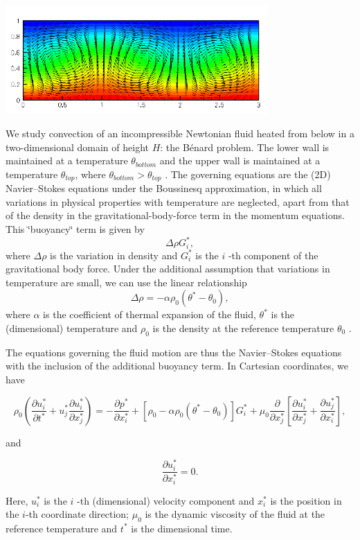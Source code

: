  
\begin{DoxyImage}
\includegraphics[width=0.75\textwidth]{symm_broken}
\end{DoxyImage}


We study convection of an incompressible Newtonian fluid heated from below in a two-\/dimensional domain of height $ H $\+: the B\'{e}nard problem. The lower wall is maintained at a temperature $ \theta_{bottom} $ and the upper wall is maintained at a temperature $ \theta_{top} $, where $ \theta_{bottom} > \theta_{top} $ . The governing equations are the (2D) Navier--Stokes equations under the Boussinesq approximation, in which all variations in physical properties with temperature are neglected, apart from that of the density in the gravitational-\/body-\/force term in the momentum equations. This \char`\"{}buoyancy\char`\"{} term is given by \[ \Delta\rho G^{*}_{i}, \] where $ \Delta\rho $ is the variation in density and $ G^{*}_{i} $ is the $ i $ -\/th component of the gravitational body force. Under the additional assumption that variations in temperature are small, we can use the linear relationship \[ \Delta\rho = -\alpha\rho_{0}(\theta^{*} - \theta_{0}), \] where $ \alpha $ is the coefficient of thermal expansion of the fluid, $ \theta^{*} $ is the (dimensional) temperature and $ \rho_{0} $ is the density at the reference temperature $ \theta_{0} $ .

The equations governing the fluid motion are thus the Navier--Stokes equations with the inclusion of the additional buoyancy term. In Cartesian coordinates, we have \begin{center} \[ \rho_{0} \left (\frac{\partial u^{*}_i}{\partial t^{*}} + u^{*}_j \frac{\partial u^{*}_i}{\partial x^{*}_j} \right) = - \frac{\partial p^{*}}{\partial x^{*}_i} + \left[\rho_{0} - \alpha\rho_{0}(\theta^{*} - \theta_{0})\right] G^{*}_i + \mu_{0} \frac{\partial }{\partial x^{*}_j} \left[ \frac{\partial u^{*}_i}{\partial x^{*}_j} + \frac{\partial u^{*}_j}{\partial x^{*}_i} \right], \] \end{center}  and \begin{center} \[ \frac{\partial u^{*}_i}{\partial x^{*}_i} = 0. \] \end{center}  Here, $ u^{*}_{i} $ is the $ i $ -\/th (dimensional) velocity component and $ x^{*}_{i} $ is the position in the $i$-\/th coordinate direction; $ \mu_{0} $ is the dynamic viscosity of the fluid at the reference temperature and $ t^{*} $ is the dimensional time.

